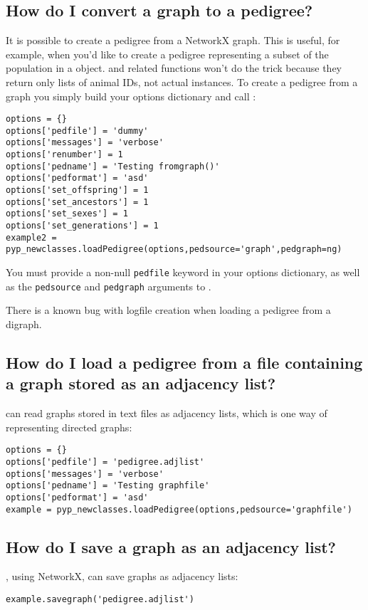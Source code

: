 \subsection{How do I convert a graph to a pedigree?}
\label{sec:howto-graph-to-pedigree}
It is possible to create a \PyPedal{} pedigree from a NetworkX graph. This is useful, for example, when you'd like to create a pedigree representing a subset of the population in a  object.  and related functions won't do the trick because they return only lists of animal IDs, not actual  instances. To create a pedigree from a graph you simply build your options dictionary and call :
\begin{verbatim}
options = {}
options['pedfile'] = 'dummy'
options['messages'] = 'verbose'
options['renumber'] = 1
options['pedname'] = 'Testing fromgraph()'
options['pedformat'] = 'asd'
options['set_offspring'] = 1
options['set_ancestors'] = 1
options['set_sexes'] = 1
options['set_generations'] = 1
example2 = pyp_newclasses.loadPedigree(options,pedsource='graph',pedgraph=ng)
\end{verbatim}
You must provide a non-null \texttt{pedfile} keyword in your options dictionary, as well as the \texttt{pedsource} and \texttt{pedgraph} arguments to .

There is a known bug with logfile creation when loading a pedigree from a digraph.
\subsection{How do I load a pedigree from a file containing a graph stored as an adjacency list?}
\label{sec:howto-pedigree-from-graph-file}
\PyPedal{} can read graphs stored in text files as adjacency lists, which is one way of representing directed graphs:
\begin{verbatim}
options = {}
options['pedfile'] = 'pedigree.adjlist'
options['messages'] = 'verbose'
options['pedname'] = 'Testing graphfile'
options['pedformat'] = 'asd'
example = pyp_newclasses.loadPedigree(options,pedsource='graphfile')
\end{verbatim}
\subsection{How do I save a graph as an adjacency list?}
\label{sec:howto-graph-to-file}
\PyPedal{}, using NetworkX, can save graphs as adjacency lists:
\begin{verbatim}
example.savegraph('pedigree.adjlist')
\end{verbatim}
